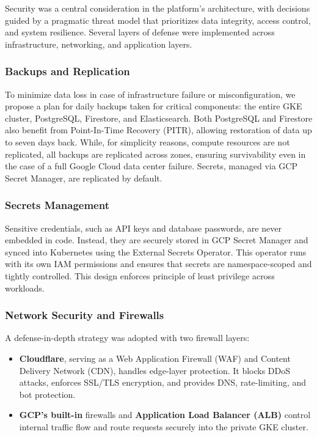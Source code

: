 \documentclass[11pt,a4paper]{article}
\begin{document}
Security was a central consideration in the platform’s architecture, with decisions guided by a pragmatic threat model that prioritizes data integrity, access control, and system resilience. Several layers of defense were implemented across infrastructure, networking, and application layers.

\subsubsection{Backups and Replication}

To minimize data loss in case of infrastructure failure or misconfiguration, we propose a plan for daily backups taken for critical components: the entire GKE cluster, PostgreSQL, Firestore, and Elasticsearch. Both PostgreSQL and Firestore also benefit from Point-In-Time Recovery (PITR), allowing restoration of data up to seven days back. While, for simplicity reasons, compute resources are not replicated, all backups are replicated across zones, ensuring survivability even in the case of a full Google Cloud data center failure. Secrets, managed via GCP Secret Manager, are replicated by default.

\subsubsection{Secrets Management}

Sensitive credentials, such as API keys and database passwords, are never embedded in code. Instead, they are securely stored in GCP Secret Manager and synced into Kubernetes using the External Secrets Operator. This operator runs with its own IAM permissions and ensures that secrets are namespace-scoped and tightly controlled. This design enforces principle of least privilege across workloads.

\subsubsection{Network Security and Firewalls}

A defense-in-depth strategy was adopted with two firewall layers:
\begin{itemize}
\item \textbf{Cloudflare}, serving as a Web Application Firewall (WAF) and Content Delivery Network (CDN), handles edge-layer protection. It blocks DDoS attacks, enforces SSL/TLS encryption, and provides DNS, rate-limiting, and bot protection.
\item \textbf{GCP’s built-in} firewalls and \textbf{Application Load Balancer (ALB)} control internal traffic flow and route requests securely into the private GKE cluster.
\end{itemize}
    
\end{document}
